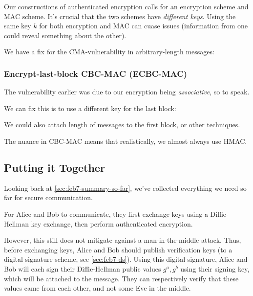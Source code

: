 \begin{remark*}
    Our constructions of authenticated encryption calls for an encryption scheme and MAC scheme. It's crucial that the two schemes have \emph{different keys}. Using the same key $k$ for both encryption and MAC can cuase issues (information from one could reveal something about the other).
\end{remark*}

We have a fix for the CMA-vulnerability in arbitrary-length messages:

\subsubsection{Encrypt-last-block CBC-MAC (ECBC-MAC)}
The vulnerability earlier was due to our encryption being \emph{associative}, so to speak.

We can fix this is to use a different key for the last block:


We could also attach length of messages to the first block, or other techniques.

The nuance in CBC-MAC means that realistically, we almost always use HMAC.

\subsection{Putting it Together}

Looking back at \cref{sec:feb7-summary-so-far}, we've collected everything we need so far for secure communication.

For Alice and Bob to communicate, they first exchange keys using a Diffie-Hellman key exchange, then perform authenticated encryption.


However, this still does not mitigate against a man-in-the-middle attack. Thus, before exchanging keys, Alice and Bob should publish verification keys (to a digital signature scheme, see \cref{sec:feb7-ds}). Using this digital signature, Alice and Bob will each sign their Diffie-Hellman public values $g^a, g^b$ using their signing key, which will be attached to the message. They can respectively verify that these values came from each other, and not some Eve in the middle.